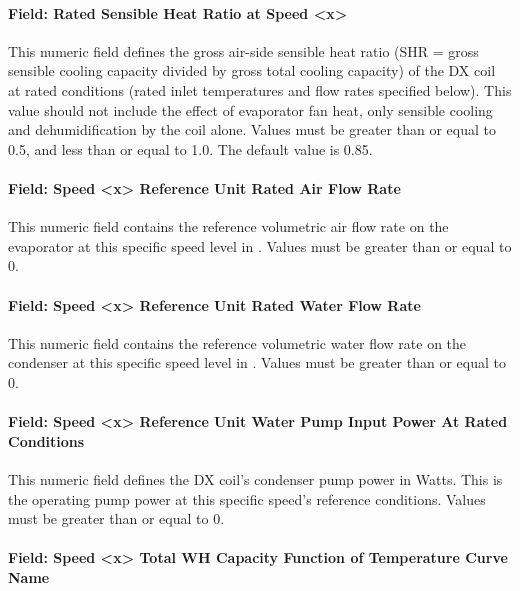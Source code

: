 \paragraph{Field: Rated Sensible Heat Ratio at Speed \textless{}x\textgreater{}}\label{vshpwhheating-rated-sensible-heat-ratio-at-speed-x}

This numeric field defines the gross air-side sensible heat ratio (SHR = gross sensible cooling capacity divided by gross total cooling capacity) of the DX coil at rated conditions (rated inlet temperatures and flow rates specified below). This value should not include the effect of evaporator fan heat, only sensible cooling and dehumidification by the coil alone.
Values must be greater than or equal to 0.5, and less than or equal to 1.0. The default value is 0.85.


\paragraph{Field: Speed \textless{}x\textgreater{} Reference Unit Rated Air Flow Rate}\label{vshpwhheating-speed-x-reference-unit-rated-air-flow-rate}
This numeric field contains the reference volumetric air flow rate on the evaporator at this specific speed level in \si{\volumeFlowRate}. Values must be greater than or equal to 0.


\paragraph{Field: Speed \textless{}x\textgreater{} Reference Unit Rated Water Flow Rate}\label{vshpwhheating-speed-x-reference-unit-rated-water-flow-rate}
This numeric field contains the reference volumetric water flow rate on the condenser at this specific speed level in \si{\volumeFlowRate}. Values must be greater than or equal to 0.


\paragraph{Field: Speed \textless{}x\textgreater{} Reference Unit Water Pump Input Power At Rated Conditions}\label{vshpwhheating-speed-x-reference-unit-water-pump-input-power-at-rated-conditions}

This numeric field defines the DX coil's condenser pump power in Watts. This is the operating pump power at this specific speed's reference conditions.
Values must be greater than or equal to 0.


\paragraph{Field: Speed \textless{}x\textgreater{} Total WH Capacity Function of Temperature Curve Name}\label{vshpwhheating-speed-x-total-wh-capacity-function-of-temperature-curve-name}


